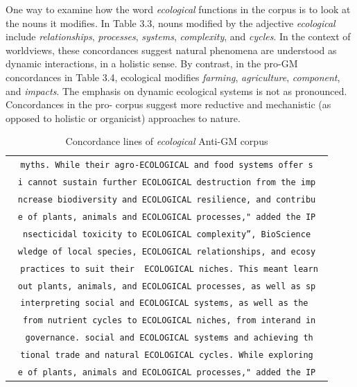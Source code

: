 One way to examine how the word \textit{ecological} functions in the corpus is to look at the nouns it modifies. In Table 3.3, nouns modified by the adjective \textit{ecological} include \textit{relationships}, \textit{processes}, \textit{systems}, \textit{complexity}, and \textit{cycles}. In the context of worldviews, these concordances suggest natural phenomena are understood as dynamic interactions, in a holistic sense. By contrast, in the pro-GM concordances in Table 3.4, ecological modifies \textit{farming}, \textit{agriculture}, \textit{component}, and \textit{impacts}. The emphasis on dynamic ecological systems is not as pronounced. Concordances in the pro- corpus suggest more reductive and mechanistic (as opposed to holistic or organicist) approaches to nature.

\begin{table}[h]
\begin{footnotesize}
\centering
\def\arraystretch{1.1}%
 \begin{tabular}{c} 

\texttt{\ myths. While their agro-ECOLOGICAL and food systems offer s } \\ 
\texttt{i cannot sustain further ECOLOGICAL destruction from the imp} \\ 
\texttt{ncrease biodiversity and ECOLOGICAL resilience, and contribu} \\ 
\texttt{e of plants, animals and ECOLOGICAL processes," added the IP} \\ 
\texttt{nsecticidal toxicity to ECOLOGICAL complexity'', BioScience} \\ 
\texttt{wledge of local species, ECOLOGICAL relationships, and ecosy} \\ 
\texttt{\ \ practices to suit their \ ECOLOGICAL niches. This meant learn } \\ 
\texttt{out plants, animals, and ECOLOGICAL processes, as well as sp} \\ 
\texttt{interpreting social and ECOLOGICAL systems, as well as the  }\\ 
\texttt{ from nutrient cycles to ECOLOGICAL niches, from interand in} \\ 
\texttt{ governance. social and ECOLOGICAL systems and achieving th} \\ 
\texttt{ tional trade and natural ECOLOGICAL cycles. While exploring } \\ 
\texttt{e of plants, animals and ECOLOGICAL processes," added the IP} \\
 \end{tabular}
\caption{Concordance lines of \textit{ecological} Anti-GM corpus}
\label{tab:table1}
\end{footnotesize}
\end{table}

